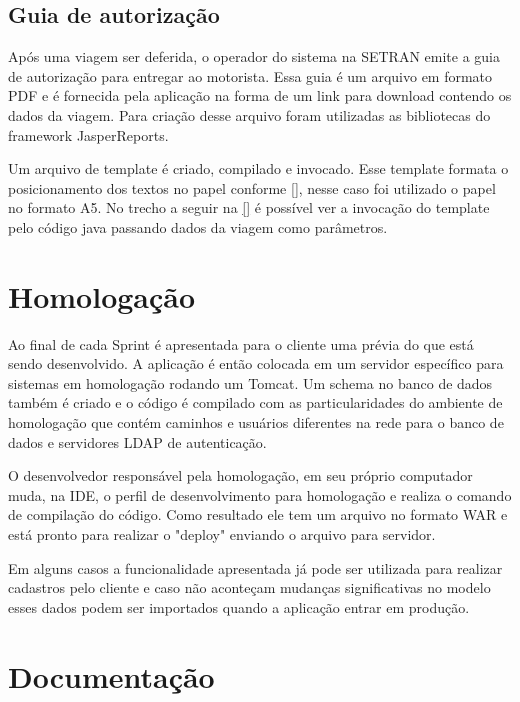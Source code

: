 \subsection{Guia de autorização}
\label{sbs:desenvolvimentoJasper}

Após uma viagem ser deferida, o operador do sistema na SETRAN emite a guia de autorização para entregar ao motorista. Essa guia é um arquivo em formato PDF e é fornecida pela aplicação na forma de um link para download contendo os dados da viagem. Para criação desse arquivo foram utilizadas as bibliotecas do framework JasperReports. 

Um arquivo de template é criado, compilado e invocado. Esse template formata o posicionamento dos textos no papel conforme \autoref{}, nesse caso foi utilizado o papel no formato A5.
No trecho a seguir na \autoref{} é possível ver a invocação do template pelo código java passando dados da viagem como parâmetros.


\section{Homologação}
\label{sec:atividadesRealizadasHomologacao}

Ao final de cada Sprint é apresentada para o cliente uma prévia do que está sendo desenvolvido. A aplicação é então colocada em um servidor específico para sistemas em homologação rodando um Tomcat. Um schema no banco de dados também é criado e o código é compilado com as particularidades do ambiente de homologação que contém caminhos e usuários diferentes na rede para o banco de dados e servidores LDAP de autenticação. 

O desenvolvedor responsável pela homologação, em seu próprio computador muda, na IDE, o perfil de desenvolvimento para homologação e realiza o comando de compilação do código. Como resultado ele tem um arquivo no formato WAR e está pronto para realizar o "deploy" enviando o arquivo para servidor.

Em alguns casos a funcionalidade apresentada já pode ser utilizada para realizar cadastros pelo cliente e caso não aconteçam mudanças significativas no modelo esses dados podem ser importados quando a aplicação entrar em produção. 



\section{Documentação}
\label{sec:atividadesRealizadasDocumentacao}


